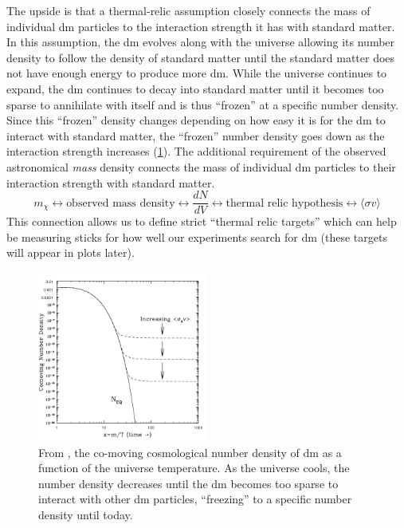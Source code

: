 The upside is that a thermal-relic assumption closely connects the mass of individual \ac{dm}
particles to the interaction strength it has with standard matter. In this assumption, the \ac{dm}
evolves along with the universe allowing its number density to follow the density of standard
matter until the standard matter does not have enough energy to produce more \ac{dm}.
While the universe continues to expand, the \ac{dm} continues to decay into standard matter until
it becomes too sparse to annihilate with itself and is thus ``frozen'' at a specific
number density. Since this ``frozen'' density changes depending on how easy it is for the
\ac{dm} to interact with standard matter, the ``frozen'' number density goes down as the
interaction strength increases (\cref{fig:number-density}). The additional requirement of the
observed astronomical \emph{mass} density connects the mass of individual \ac{dm} particles to
their interaction strength with standard matter.
\begin{equation}\label{eqn:dm-mass-interaction-strength-connection}
	m_\chi \leftrightarrow \text{observed mass density}
	\leftrightarrow \frac{dN}{dV} \leftrightarrow
	\text{thermal relic hypothesis} \leftrightarrow
	\langle\sigma v\rangle
\end{equation}
This connection allows us to define strict ``thermal relic targets'' which can help be measuring
sticks for how well our experiments search for \ac{dm} (these targets will appear in plots later).

\begin{figure}
	\centering
	\includegraphics[width=0.5\textwidth]{figures/theory/number-density-at-freeze-out.png}
	\caption{
		From \cite{thermal-freezeout-diagram-1996}, the co-moving cosmological number density of \ac{dm} as a function of the universe
		temperature. As the universe cools, the number density decreases until the \ac{dm}
		becomes too sparse to interact with other \ac{dm} particles, ``freezing'' to a specific
		number density until today.
	}
	\label{fig:number-density}
\end{figure}


